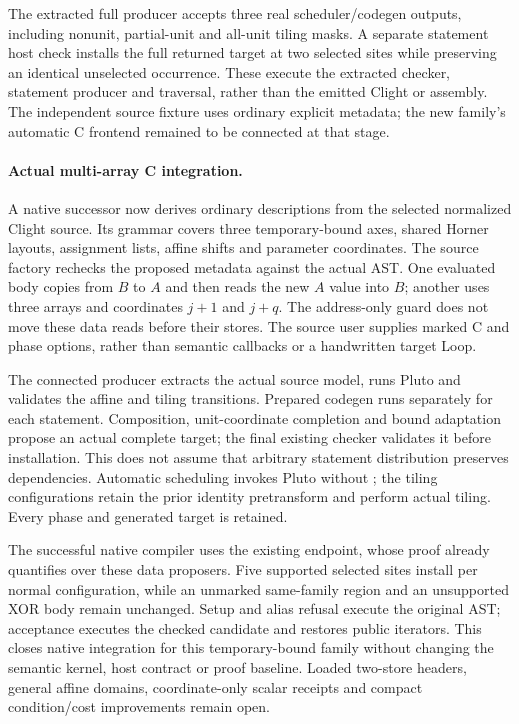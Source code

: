 The extracted full producer accepts three real scheduler/codegen outputs,
including nonunit, partial-unit and all-unit tiling masks. A separate statement
host check installs the full returned target at two selected sites while
preserving an identical unselected occurrence. These execute the extracted
checker, statement producer and traversal, rather than the emitted Clight or
assembly. The independent source fixture uses ordinary explicit metadata;
the new family's automatic C frontend remained to be connected at that stage.

\paragraph{Actual multi-array C integration.}
A native successor now derives ordinary descriptions from the selected
normalized Clight source. Its grammar covers three temporary-bound axes,
shared Horner layouts, assignment lists, affine shifts and parameter
coordinates. The source factory rechecks the proposed metadata against the
actual AST. One evaluated body copies from $B$ to $A$ and then reads the new
$A$ value into $B$; another uses three arrays and coordinates $j+1$ and $j+q$.
The address-only guard does not move these data reads before their stores.
The source user supplies marked C and phase options, rather than semantic
callbacks or a handwritten target Loop.

The connected producer extracts the actual source model, runs Pluto and
validates the affine and tiling transitions. Prepared codegen runs separately
for each statement. Composition, unit-coordinate completion and bound
adaptation propose an actual complete target; the final existing checker
validates it before installation. This does not assume that arbitrary
statement distribution preserves dependencies. Automatic scheduling invokes
Pluto without ; the tiling configurations retain the prior
identity pretransform and perform actual tiling. Every phase and generated
target is retained.

The successful native compiler uses the existing
 endpoint, whose
proof already quantifies over these data proposers. Five supported selected
sites install per normal configuration, while an unmarked same-family region
and an unsupported XOR body remain unchanged. Setup and alias refusal execute
the original AST; acceptance executes the checked candidate and restores
public iterators. This closes native integration for this temporary-bound
family without changing the semantic kernel, host contract or proof baseline.
Loaded two-store headers, general affine domains, coordinate-only scalar
receipts and compact condition/cost improvements remain open.

